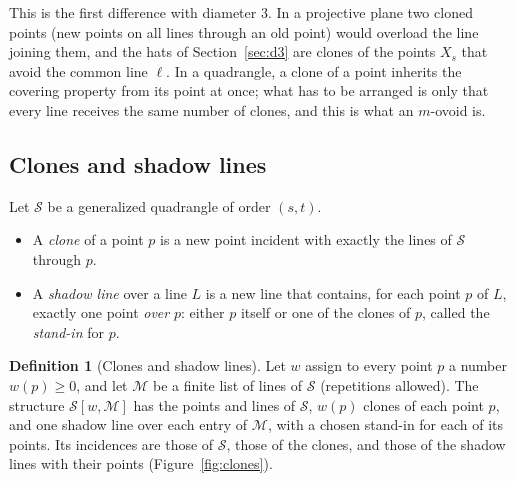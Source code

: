 \documentclass[11pt]{amsart}
\theoremstyle{definition}
\newtheorem{definition}[theorem]{Definition}
\theoremstyle{remark}
\newcommand{\cS}{\mathcal{S}}
\newcommand{\cM}{\mathcal{M}}
\begin{document}
This is the first difference with diameter $3$. In a projective plane two cloned points (new points on all lines through an old point) would overload the line joining them, and the hats of Section~\ref{sec:d3} are clones of the points $X_s$ that avoid the common line $\ell$. In a quadrangle, a clone of a point inherits the covering property from its point at once; what has to be arranged is only that every line receives the same number of clones, and this is what an $m$-ovoid is.

\subsection{Clones and shadow lines}\label{ssec:clones}
Let $\cS$ be a generalized quadrangle of order $(s,t)$.
\begin{itemize}[leftmargin=1.5em]
\item A \emph{clone} of a point $p$ is a new point incident with exactly the lines of $\cS$ through $p$.
\item A \emph{shadow line} over a line $L$ is a new line that contains, for each point $p$ of $L$, exactly one point \emph{over} $p$: either $p$ itself or one of the clones of $p$, called the \emph{stand-in} for $p$.
\end{itemize}

\begin{definition}[Clones and shadow lines]\label{def:clones}
Let $w$ assign to every point $p$ a number $w(p)\ge 0$, and let $\cM$ be a finite list of lines of $\cS$ (repetitions allowed). The structure $\cS[w,\cM]$ has the points and lines of $\cS$, $w(p)$ clones of each point $p$, and one shadow line over each entry of $\cM$, with a chosen stand-in for each of its points. Its incidences are those of $\cS$, those of the clones, and those of the shadow lines with their points (Figure~\ref{fig:clones}).
\end{definition}
\end{document}
